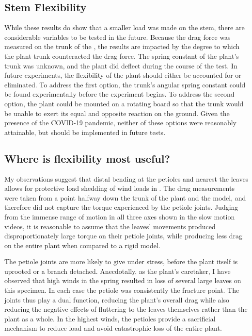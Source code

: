 \subsection{Stem Flexibility}
While these results do show that a smaller load was made on the stem, there are considerable variables to be tested in the future. Because the drag force was measured on the trunk of the \Cxparadisi, the results are impacted by the degree to which the plant trunk counteracted the drag force. The spring constant of the plant's trunk was unknown, and the plant did deflect during the course of the test. In future experiments, the flexibility of the plant should either be accounted for or eliminated. To address the first option, the trunk's angular spring constant could be found experimentally before the experiment begins. To address the second option, the plant could be mounted on a rotating board so that the trunk would be unable to exert its equal and opposite reaction on the ground. Given the presence of the COVID-19 pandemic, neither of these options were reasonably attainable, but should be implemented in future tests.

\subsection{Where is flexibility most useful?}
My observations suggest that distal bending at the petioles and nearest the leaves allows for protective load shedding of wind loads in \Cxparadisi. The drag measurements were taken from a point halfway down the trunk of the plant and the model, and therefore did not capture the torque experienced by the petiole joints. Judging from the immense range of motion in all three axes shown in the slow motion videos, it is reasonable to assume that the leaves' movements produced disproportionately large torque on their petiole joints, while producing less drag on the entire plant when compared to a rigid model. 

The petiole joints are more likely to give under stress, before the plant itself is uprooted or a branch detached. Anecdotally, as the plant's caretaker, I have observed that high winds in the spring resulted in loss of several large leaves on this specimen. In each case the petiole was consistently the fracture point. The joints thus play a dual function, reducing the plant's overall drag while also reducing the negative effects of fluttering to the leaves themselves rather than the plant as a whole. In the highest winds, the petioles provide a sacrificial mechanism to reduce load and avoid catastrophic loss of the entire plant. 


